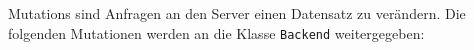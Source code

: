 Mutations sind Anfragen an den Server einen Datensatz zu verändern.
Die folgenden Mutationen werden an die Klasse \verb#Backend# weitergegeben:
